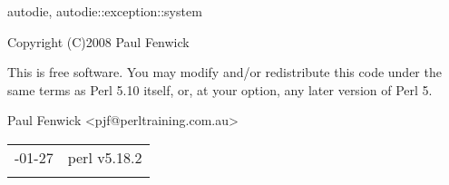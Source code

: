 \documentclass[]{article}
\begin{document}
autodie, autodie::exception::system


Copyright (C)2008 Paul Fenwick

This is free software. You may modify and/or redistribute this code
under the same terms as Perl 5.10 itself, or, at your option, any later
version of Perl 5.


Paul Fenwick \textless{}pjf@perltraining.com.au\textgreater{}

\begin{longtable}[c]{@{}ll@{}}
\toprule\addlinespace
2014-01-27 & perl v5.18.2
\\\addlinespace
\bottomrule
\end{longtable}
\end{document}
